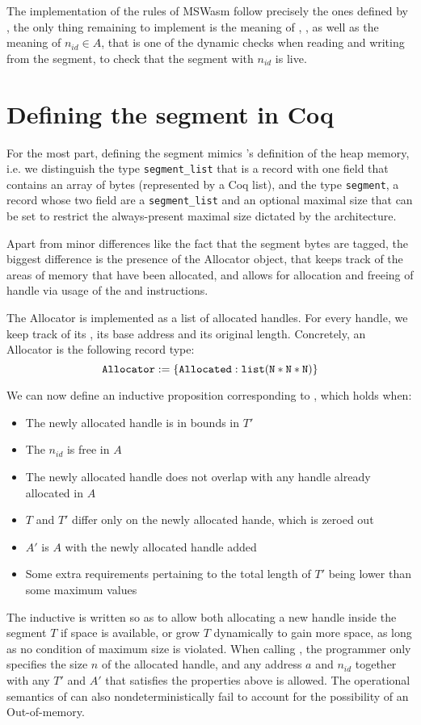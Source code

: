 \documentclass[a4paper]{article}
\begin{document}
The implementation of the rules of MSWasm follow precisely the ones defined by \citet{mswasm}, the only thing remaining to implement is the meaning of , , as well as the meaning of \( n_{id}\in A \), that is one of the dynamic checks when reading and writing from the segment, to check that the segment with \xxWid \( n_{id} \) is live.

\section{Defining the segment in Coq}

For the most part, defining the segment mimics \iriswasm's definition of the heap memory, i.e. we distinguish the type {\tt segment\_list} that is a record with one field that contains an array of bytes (represented by a Coq list), and the type {\tt segment}, a record whose two field are a {\tt segment\_list} and an optional maximal size that can be set to restrict the always-present maximal size dictated by the architecture.

Apart from minor differences like the fact that the segment bytes are tagged, the biggest difference is the presence of the Allocator object, that keeps track of the areas of memory that have been allocated, and allows for allocation and freeing of handle via usage of the \xxWsegalloc and \xxWsegfree instructions.

The Allocator is implemented as a list of allocated handles. For every handle, we keep track of its \xxWid, its base address and its original length. Concretely, an Allocator is the following record type:
\[ \tt Allocator := \{ Allocated : list (N * N * N) \} \]

We can now define an inductive proposition corresponding to , which holds when:
\begin{itemize}
\item The newly allocated handle is in bounds in \( T' \)
\item The \xxWid \( n_{id} \) is free in \( A \)
\item The newly allocated handle does not overlap with any handle already allocated in \( A \)
\item \( T \) and \( T' \) differ only on the newly allocated hande, which is zeroed out
\item \( A' \) is \( A \) with the newly allocated handle added
\item Some extra requirements pertaining to the total length of \( T' \) being lower than some maximum values
\end{itemize}
The inductive is written so as to allow both allocating a new handle inside the segment \( T \) if space is available, or grow \( T \) dynamically to gain more space, as long as no condition of maximum size is violated. When calling \xxWsegalloc, the programmer only specifies the size \( n \) of the allocated handle, and any address \( a \) and \xxWid \( n_{id} \) together with any \( T' \) and \( A' \) that satisfies the properties above is allowed. The operational semantics of \xxWsegalloc can also nondeterministically fail to account for the possibility of an Out-of-memory.
\end{document}
